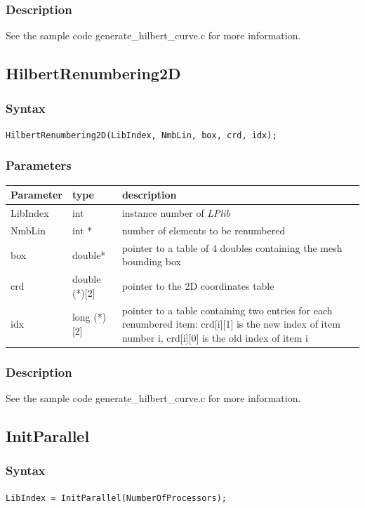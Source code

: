 \documentclass[a4paper,12pt]{article}
\begin{document}
\subsubsection*{Description}
See the sample code generate\_hilbert\_curve.c for more information.


\subsection{HilbertRenumbering2D}

\subsubsection*{Syntax}
\tt{HilbertRenumbering2D(LibIndex, NmbLin, box, crd, idx);}
\normalfont

\subsubsection*{Parameters}
\begin{tabular}{|m{2cm}|m{3cm}|m{8cm}|}
\hline
Parameter  & type   & description \\
\hline
LibIndex   & int    & instance number of \emph{LPlib} \\
\hline
NmbLin     & int * & number of elements to be renumbered \\
\hline
box        & double* & pointer to a table of 4 doubles containing the mesh bounding box \\
\hline
crd        & double (*)[2] & pointer to the 2D coordinates table \\
\hline
idx        & long (*)[2] & pointer to a table containing two entries for each renumbered item: crd[i][1] is the new index of item number i, crd[i][0] is the old index of item i \\
\hline
\end{tabular}

\subsubsection*{Description}
See the sample code generate\_hilbert\_curve.c for more information.


\subsection{InitParallel}

\subsubsection*{Syntax}
\tt{LibIndex = InitParallel(NumberOfProcessors);}
\normalfont
\end{document}
